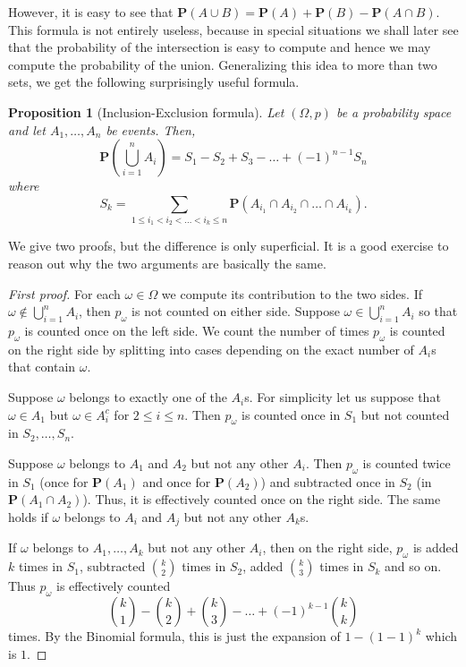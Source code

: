 \documentclass[preprint,  11pt]{amsart}
\theoremstyle{plain} %
\newtheorem{proposition}[theorem]{Proposition}
\theoremstyle{definition} %
\begin{document}
However, it is easy to see that $\mathbf{P}(A\cup B)=\mathbf{P}(A)+\mathbf{P}(B)-\mathbf{P}(A\cap B)$. This formula is not entirely useless, because in special situations we shall later see that the probability of the intersection is easy to compute and hence we may compute the probability of the union. Generalizing this idea to more than two sets, we get the following surprisingly useful formula.
 \begin{proposition}[Inclusion-Exclusion formula]
Let $(\Omega,p)$ be a probability space and let $A_{1},\ldots ,A_{n}$ be events. Then,
$$
\mathbf{P}\left(\bigcup_{i=1}^{n}A_{i}\right) = S_{1}-S_{2}+S_{3}-\ldots +(-1)^{n-1}S_{n}
$$
where
$$ 
S_{k}=\sum\limits_{1\le i_{1}<i_{2}<\ldots <i_{k}\le n}\mathbf{P}(A_{i_{1}}\cap A_{i_{2}}\cap \ldots \cap A_{i_{k}}).
$$
\end{proposition}
We give two proofs, but the difference  is only superficial. It is a good exercise to reason out why the two arguments are basically the same. 
\begin{proof}[First proof] For each $\omega\in \Omega$ we compute its contribution to the two sides. If $\omega\not\in \bigcup_{i=1}^{n}A_{i}$, then $p_{\omega}$ is not counted on either side.  Suppose $\omega\in \bigcup_{i=1}^{n}A_{i}$ so that $p_{\omega}$ is counted once on the left side. We count the number of times $p_{\omega}$ is counted on the right side by splitting into cases depending on the exact number of $A_{i}$s that contain $\omega$.

Suppose $\omega$ belongs to exactly one of the $A_{i}$s. For simplicity let us suppose that $\omega\in A_{1}$ but $\omega\in A_{i}^{c}$ for $2\le i\le n$. Then $p_{\omega}$ is counted once in $S_{1}$ but not counted in $S_{2},\ldots ,S_{n}$.

Suppose $\omega$ belongs to $A_{1}$ and $A_{2}$ but not any other $A_{i}$. Then $p_{\omega}$ is counted twice in $S_{1}$ (once for $\mathbf{P}(A_{1})$ and once for $\mathbf{P}(A_{2})$) and subtracted once in $S_{2}$ (in $\mathbf{P}(A_{1}\cap A_{2})$). Thus, it is effectively counted once on the right side. The same holds if $\omega$ belongs to $A_{i}$ and $A_{j}$ but not any other $A_{k}$s.

If $\omega$ belongs to $A_{1},\ldots ,A_{k}$ but not any other $A_{i}$, then  on the right side, $p_{\omega}$ is added $k$ times in $S_{1}$, subtracted $\binom{k}{2}$ times in $S_{2}$, added $\binom{k}{3}$ times in $S_{k}$ and so on. Thus $p_{\omega}$ is effectively counted
$$
\binom{k}{1}-\binom{k}{2}+\binom{k}{3}-\ldots +(-1)^{k-1}\binom{k}{k}
$$
times. By the Binomial formula, this is just the expansion of  $1-(1-1)^{k}$ which is $1$. 
\end{proof}
\end{document}
